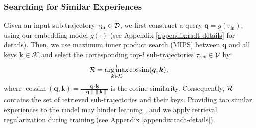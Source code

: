 \documentclass{article}
\newcommand\Bk{\bm{k}}
\newcommand\Bq{\bm{q}}
\newcommand{\cK}{\mathcal{K}} \newcommand{\cL}{\mathcal{L}}
\begin{document}
\subsubsection{Searching for Similar Experiences}
Given an input sub-trajectory $\tau_{\text{in}} \in \mathcal{D}$, we first construct a query $\Bq = g(\tau_{\text{in}})$, using our embedding model $g(\cdot)$ (see Appendix \ref{appendix:radt-details} for details).
Then, we use maximum inner product search (MIPS) between $\Bq$ and all keys $\Bk \in \cK$ and select the corresponding top-$l$ sub-trajectories $\tau_{\text{ret}} \in \mathcal{V}$ by:
\begin{equation}\label{eq:retrieve}
    \cR = \operatorname*{arg\,max}^l_{\Bk \in \cK} \operatorname{cossim} (\Bq, \Bk),
\end{equation}
where $\operatorname{cossim}(\Bq, \Bk) = \frac{\mathbf{q} \cdot \mathbf{k}}{\|\mathbf{q}\| \|\mathbf{k}\|}$
is the cosine similarity.
Consequently, $\mathcal{R}$ contains the set of retrieved sub-trajectories and their keys.
Providing too similar experiences to the model may hinder learning \citep{yasunaga_retrieval_2023}, and we apply retrieval regularization during training (see Appendix \ref{appendix:radt-details}).
\end{document}
